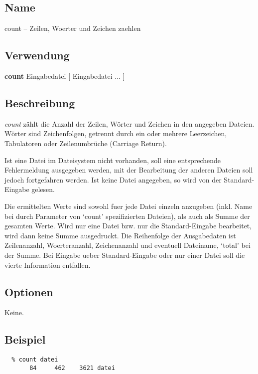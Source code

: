 
\subsection*{Name}

count -- Zeilen, Woerter und Zeichen zaehlen

\subsection*{Verwendung}

{\bf count} Eingabedatei [ Eingabedatei ... ]

\subsection*{Beschreibung}

{\it count} z\"ahlt die Anzahl der Zeilen, W\"orter und Zeichen in
den angegeben Dateien.
W\"orter sind Zeichenfolgen, getrennt durch ein oder mehrere
Leerzeichen, Tabulatoren oder Zeilenumbr\"uche (Carriage Return).

Ist eine Datei im Dateisystem nicht vorhanden, soll eine
entsprechende Fehlermeldung ausgegeben werden, mit der Bearbeitung der
anderen Dateien soll jedoch fortgefahren werden. Ist keine Datei
angegeben, so wird von der Standard-Eingabe gelesen.

Die ermittelten Werte sind sowohl fuer jede Datei einzeln anzugeben
(inkl. Name bei durch Parameter von `count' spezifizierten Dateien),
als auch als Summe der gesamten Werte.  Wird nur eine Datei bzw. nur
die Standard-Eingabe bearbeitet, wird dann keine Summe
ausgedruckt. Die Reihenfolge der Ausgabedaten ist Zeilenanzahl,
Woerteranzahl, Zeichenanzahl und eventuell Dateiname, `total' bei der
Summe. Bei Eingabe ueber Standard-Eingabe oder nur einer Datei soll
die vierte Information entfallen. 

\subsection*{Optionen}

Keine.

\subsection*{Beispiel}

\begin{verbatim}
  % count datei
       84     462    3621 datei
\end{verbatim}

